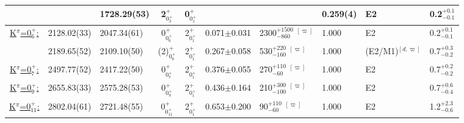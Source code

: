 \begin{landscape}
\begin{center}
\begin{longtable}{cllcccllll}
                                &              & 1728.29(53)                & 2$^+_{0^+_3}$    & 0$^+_{0^+_1}$ &&                                                     &0.259(4)        & E2                & 0.2$^{+0.1}_{-0.1}$  \\ \hline   
\underline{K$^\pi$=0$^+_6$:}    & 2128.02(33)  & 2047.34(61)                & 0$^+_{0^+_6}$    & 2$^+_{0^+_1}$ &0.071$\pm$0.031& 2300$^{+1500}_{-860}$ $^{[\varpi]}$ &1.000           & E2                & 0.2$^{+0.1}_{-0.1}$       \\  
                                & 2189.65(52)  & 2109.10(50)                & (2)$^+_{0^+_{6}}$& 2$^+_{0^+_1}$ &0.267$\pm$0.058& 530$^{+220}_{-160}$ $^{[\varpi]}$   &1.000           &(E2/M1)$^{[d,\varpi]}$    & 0.7$^{+0.3}_{-0.2}$   \\  \hline
\underline{K$^\pi$=0$^+_7$:}    & 2497.77(52)  & 2417.22(50)                & 0$^+_{0^+_7}$    & 2$^+_{0^+_1}$ &0.376$\pm$0.055& 270$^{+110}_{-60}$ $^{[\varpi]}$    &1.000           & E2                & 0.7$^{+0.2}_{-0.2}$     \\ \hline
\underline{K$^\pi$=0$^+_9$:}    & 2655.83(33)  & 2575.28(53)                & 0$^+_{0^+_9}$    & 2$^+_{0^+_1}$ &0.436$\pm$0.164& 210$^{+300}_{-100}$ $^{[\varpi]}$   &1.000           & E2                & 0.7$^{+0.6}_{-0.4}$       \\ \hline
\underline{K$^\pi$=0$^+_{11}$:} & 2802.04(61)  & 2721.48(55)                & 0$^+_{0^+_{11}}$ & 2$^+_{0^+_1}$ &0.653$\pm$0.200& 90$^{+110}_{-60}$ $^{[\varpi]}$     &1.000           & E2                & 1.2$^{+2.3}_{-0.6}$      \\ \hline
 


\end{longtable}
\end{center}
\end{landscape}

